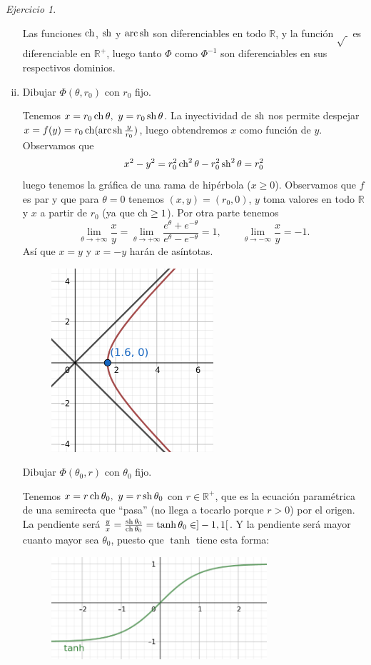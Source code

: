 \documentclass[12pt,spanish]{article}
\theoremstyle{definition}
\theoremstyle{remark}
\newtheorem{exercise}{Ejercicio}
\newcommand{\R}{\mathbb{R}}
\begin{document}
\begin{exercise}
\begin{enumerate}[i)]
    Las funciones $\operatorname{ch}$, $\operatorname{sh}$ y $\operatorname{arc}\operatorname{sh}$ son diferenciables en todo
    $\R$, y la función $\sqrt{~}$ es diferenciable en $\R^+$, luego
    tanto $\Phi$ como $\Phi^{-1}$ son diferenciables en sus
    respectivos dominios.
    
  \item Dibujar $\Phi(\theta, r_0)$ con $r_0$ fijo.

    Tenemos $x=r_0\ch\theta,\ y=r_0\sh\theta$. La inyectividad de
    $\operatorname{sh}$ nos permite despejar \\ $x=f(y)=r_0\operatorname{ch}(\operatorname{arc}\operatorname{sh}\frac{y}{r_0})$,
    luego obtendremos $x$ como función de $y$. Observamos que
    \[x^2-y^2=r_0^2\operatorname{ch}^2\theta-r_0^2\operatorname{sh}^2\theta=r_0^2\] luego tenemos la
    gráfica de una rama de hipérbola ($x\geq 0$). Observamos que $f$ es
    par y que para $\theta = 0$ tenemos $(x,y) = (r_0,0)$, $y$ toma
    valores en todo $\R$ y $x$ a partir de $r_0$ (ya que $\operatorname{ch}\geq 1$). Por
    otra parte tenemos
    \begin{equation*} \lim_{\theta\to
        +\infty}\frac{x}{y}=\lim_{\theta\to
        +\infty}\frac{e^\theta+e^{-\theta}}{e^\theta-e^{-\theta}}=1,\qquad\lim_{\theta\to
        -\infty}\frac{x}{y}=-1.
    \end{equation*} Así que $x=y$ y $x=-y$ harán de asíntotas.

    \begin{figure}[H] \centering
      \includegraphics[width=60mm]{hiperbola1}
    \end{figure}

    Dibujar $\Phi(\theta_0,r)$ con $\theta_0$ fijo.

    Tenemos $x=r\ch\theta_0,\ y=r\sh\theta_0$ con $r\in\R^+$, que es
    la ecuación paramétrica de una semirecta que ``pasa'' (no llega a
    tocarlo porque $r>0$) por el origen. La pendiente será
    $\frac{y}{x}=\frac{\operatorname{sh}\theta_0}{\operatorname{ch}\theta_0}=\tanh\theta_0\in
    ]-1,1[$. Y la pendiente será mayor cuanto mayor sea $\theta_0$,
    puesto que $\tanh$ tiene esta forma:
    \begin{figure}[H] \centering
      \includegraphics[width=80mm]{tanh}
    \end{figure}


\end{enumerate}
\end{exercise}
\end{document}

